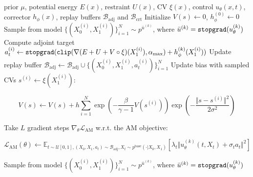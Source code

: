 \documentclass[]{fairmeta}
\theoremstyle{remark}
\begin{document}
\begin{algorithm}[!ht]
\small
\caption{WT-ASBS with replay buffer}
\label{alg:wt_asbs_buffer}
\begin{algorithmic}[1]
\Require prior $\mu$, potential energy $E(x)$, restraint $U(x)$, CV $\xi(x)$, control $u_\theta(x, t)$, corrector $h_\phi(x)$, replay buffers $\mathcal{B}_\text{adj}$ and $\mathcal{B}_\text{crt}$
\State Initialize $V(s) \gets 0$, $h_\phi^{(0)} \gets 0$ 
     
        \State Sample from model $\{(X_0^{(i)}, X_1^{(i)})\}_{i=1}^N \sim p^{\bar{u}^{(k)}}$, where $\bar{u}^{(k)} = \text{\texttt{stopgrad}}(u_\theta^{(k)})$
        \State Compute adjoint target $a_t^{(i)} \gets \text{\texttt{stopgrad}}(\text{\texttt{clip}}(\nabla (E + U + V \circ \xi)(X_1^{(i)}), \alpha_\text{max}) + h_\phi^{(k)}(X_1^{(i)}))$
        \State Update replay buffer $\mathcal{B}_\text{adj} \gets \mathcal{B}_\text{adj} \cup \{(X_0^{(i)}, X_1^{(i)}, a_t^{(i)})\}_{i=1}^N$
        \State Update bias with sampled CVs $s^{(i)} \gets \xi(X_1^{(i)})$: \\
        \begin{minipage}{\textwidth}
        \begin{equation}
        \textstyle
        V(s) \gets V(s) + h \sum_{i=1}^{N} \exp(-\frac{\beta}{\gamma-1} V(s^{(i)})) \exp(-\frac{\Vert s - s^{(i)} \Vert^2}{2\sigma^2})
        \end{equation}
        \end{minipage}
        \State Take $L$ gradient steps $\nabla_\theta \mathcal{L}_\text{AM}$ w.r.t. the AM objective: \\
        \begin{minipage}{\textwidth}
        \begin{equation}
        \textstyle
        \mathcal{L}_\text{AM}(\theta) \gets \mathbb{E}_{t \sim \mathcal{U}[0, 1], (X_0, X_1, a_t) \sim \mathcal{B}_\text{adj}, X_t \sim p^\text{base}(\cdot | X_0, X_1)} \left[ \lambda_t \Vert u_\theta^{(k)}(t, X_t) + \sigma_t a_t \Vert^2 \right]
        \end{equation}
        \end{minipage}
    \EndFor
    \vspace{1ex}
        \State Sample from model $\{(X_0^{(i)}, X_1^{(i)})\}_{i=1}^N \sim p^{\bar{u}^{(k)}}$, where $\bar{u}^{(k)} = \text{\texttt{stopgrad}}(u_\theta^{(k)})$

\end{algorithmic}
\end{algorithm}
\end{document}
